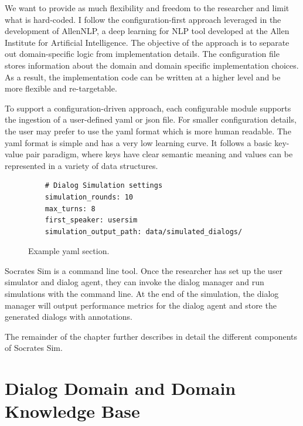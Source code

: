 We want to provide as much flexibility and freedom to the researcher and limit what is hard-coded. I follow the configuration-first approach leveraged in the development of AllenNLP, a deep learning for NLP tool developed at the Allen Institute for Artificial Intelligence. The objective of the approach is to separate out domain-specific logic from implementation details. The configuration file stores information about the domain and domain specific implementation choices. As a result, the implementation code can be written at a higher level and be more flexible and re-targetable. 

To support a configuration-driven approach, each configurable module supports the ingestion of a user-defined yaml or json file. For smaller configuration details, the user may prefer to use the yaml format which is more human readable. The yaml format is simple and has a very low learning curve. It follows a basic key-value pair paradigm, where keys have clear semantic meaning and values can be represented in a variety of data structures. 

\begin{figure}[h!]
	\begin{lstlisting}
	# Dialog Simulation settings
	simulation_rounds: 10
	max_turns: 8
	first_speaker: usersim
	simulation_output_path: data/simulated_dialogs/
	\end{lstlisting}
	\caption{Example yaml section.}
	\label{fig:ex_yaml}
\end{figure}

Socrates Sim is a command line tool. Once the researcher has set up the user simulator and dialog agent, they can invoke the dialog manager and run simulations with the command line. At the end of the simulation, the dialog manager will output performance metrics for the dialog agent and store the generated dialogs with annotations.

The remainder of the chapter further describes in detail the different components of Socrates Sim.

\section{Dialog Domain and Domain Knowledge Base}
\label{sssec:dialog_domain}

